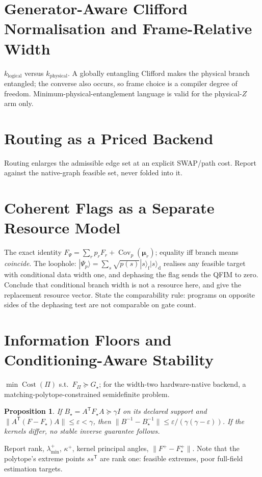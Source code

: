 \documentclass[11pt]{article}
\newtheorem{proposition}{Proposition}
\begin{document}
\section{Generator-Aware Clifford Normalisation and Frame-Relative Width}
$k_{\mathrm{logical}}$ versus $k_{\mathrm{physical}}$. A globally entangling Clifford makes
the physical branch entangled; the converse also occurs, so frame choice is a compiler degree
of freedom. Minimum-physical-entanglement language is valid for the physical-$Z$ arm only.

\section{Routing as a Priced Backend}
Routing enlarges the admissible edge set at an explicit SWAP/path cost. Report against the
native-graph feasible set, never folded into it.

\section{Coherent Flags as a Separate Resource Model}
The exact identity $F_\Psi=\sum_rp_rF_r+\operatorname{Cov}_p(\bm\mu_r)$; equality iff branch
means \emph{coincide}. The loophole: $|\Psi_p\rangle=\sum_s\sqrt{p(s)}|s\rangle_{\mathrm
f}|s\rangle_{\mathrm d}$ realises any feasible target with conditional data width one, and
dephasing the flag sends the QFIM to zero. Conclude that conditional branch width is not a
resource here, and give the replacement resource vector. State the comparability rule:
programs on opposite sides of the dephasing test are not comparable on gate count.

\section{Information Floors and Conditioning-Aware Stability}
$\min\operatorname{Cost}(\Pi)$ s.t.\ $F_\Pi\succeq G_\star$; for the width-two hardware-native
backend, a matching-polytope-constrained semidefinite problem.
\begin{proposition}
If $B_\star=A^{\mathsf T}F_\star A\succeq\gamma I$ on its declared support and
$\|A^{\mathsf T}(F-F_\star)A\|\le\varepsilon<\gamma$, then
$\|B^{-1}-B_\star^{-1}\|\le\varepsilon/(\gamma(\gamma-\varepsilon))$. If the kernels differ,
no stable inverse guarantee follows.
\end{proposition}
Report rank, $\lambda^+_{\min}$, $\kappa^+$, kernel principal angles, $\|F^+-F_\star^+\|$.
Note that the polytope's extreme points $ss^{\mathsf T}$ are rank one: feasible extremes,
poor full-field estimation targets.
\end{document}
